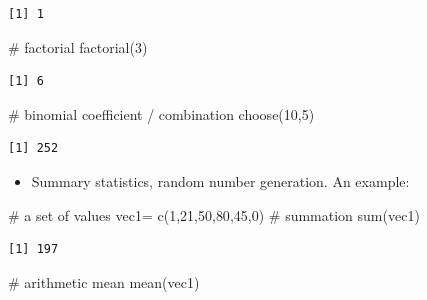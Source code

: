 \documentclass[
  letterpaper,
  DIV=11,
  numbers=noendperiod]{scrreprt}
\newenvironment{Shaded}{\begin{snugshade}}{\end{snugshade}}
\newcommand{\CommentTok}[1]{\textcolor[rgb]{0.37,0.37,0.37}{#1}}
\newcommand{\DecValTok}[1]{\textcolor[rgb]{0.68,0.00,0.00}{#1}}
\newcommand{\FunctionTok}[1]{\textcolor[rgb]{0.28,0.35,0.67}{#1}}
\newcommand{\NormalTok}[1]{\textcolor[rgb]{0.00,0.23,0.31}{#1}}
\newcommand{\OtherTok}[1]{\textcolor[rgb]{0.00,0.23,0.31}{#1}}
\providecommand{\tightlist}{%
  \setlength{\itemsep}{0pt}\setlength{\parskip}{0pt}}\usepackage{longtable,booktabs,array}
\begin{document}
\begin{verbatim}
[1] 1
\end{verbatim}

\begin{Shaded}
\begin{Highlighting}[]
\CommentTok{\# factorial}
\FunctionTok{factorial}\NormalTok{(}\DecValTok{3}\NormalTok{)}
\end{Highlighting}
\end{Shaded}

\begin{verbatim}
[1] 6
\end{verbatim}

\begin{Shaded}
\begin{Highlighting}[]
\CommentTok{\# binomial coefficient / combination}
\FunctionTok{choose}\NormalTok{(}\DecValTok{10}\NormalTok{,}\DecValTok{5}\NormalTok{)}
\end{Highlighting}
\end{Shaded}

\begin{verbatim}
[1] 252
\end{verbatim}

\begin{itemize}
\tightlist
\item
  Summary statistics, random number generation. An example:
\end{itemize}

\begin{Shaded}
\begin{Highlighting}[]
\CommentTok{\# a set of values}
\NormalTok{vec1}\OtherTok{=} \FunctionTok{c}\NormalTok{(}\DecValTok{1}\NormalTok{,}\DecValTok{21}\NormalTok{,}\DecValTok{50}\NormalTok{,}\DecValTok{80}\NormalTok{,}\DecValTok{45}\NormalTok{,}\DecValTok{0}\NormalTok{)}
\CommentTok{\# summation}
\FunctionTok{sum}\NormalTok{(vec1)}
\end{Highlighting}
\end{Shaded}

\begin{verbatim}
[1] 197
\end{verbatim}

\begin{Shaded}
\begin{Highlighting}[]
\CommentTok{\# arithmetic mean}
\FunctionTok{mean}\NormalTok{(vec1)}
\end{Highlighting}
\end{Shaded}
\end{document}
